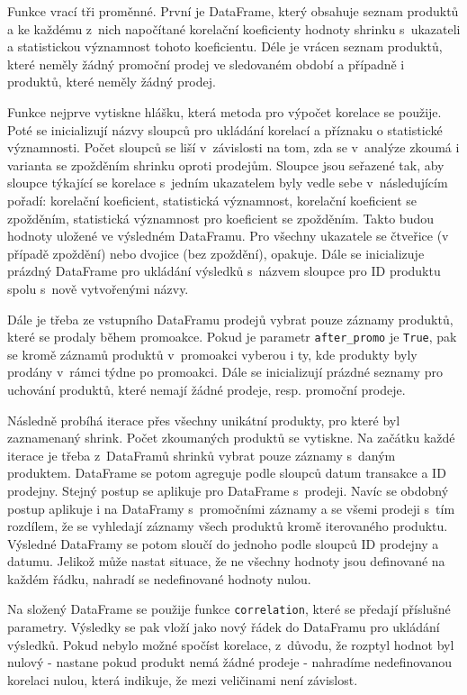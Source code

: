 Funkce vrací tři proměnné. První je DataFrame, který obsahuje seznam produktů a ke každému z~nich napočítané korelační koeficienty hodnoty shrinku s~ukazateli a statistickou významnost tohoto koeficientu. Déle je vrácen seznam produktů, které neměly žádný promoční prodej ve sledovaném období a případně i produktů, které neměly žádný prodej.

Funkce nejprve vytiskne hlášku, která metoda pro výpočet korelace se použije. Poté se inicializují názvy sloupců pro ukládání korelací a příznaku o statistické významnosti. Počet sloupců se liší v~závislosti na tom, zda se v~analýze zkoumá i varianta se zpožděním shrinku oproti prodejům. Sloupce jsou seřazené tak, aby sloupce týkající se korelace s~jedním ukazatelem byly vedle sebe v~následujícím pořadí: korelační koeficient, statistická významnost, korelační koeficient se zpožděním, statistická významnost pro koeficient se zpožděním. Takto budou hodnoty uložené ve výsledném DataFramu. Pro všechny ukazatele se čtveřice (v případě zpoždění) nebo dvojice (bez zpoždění), opakuje. Dále se inicializuje prázdný DataFrame pro ukládání výsledků s~názvem sloupce pro ID produktu spolu s~nově vytvořenými názvy. 

Dále je třeba ze vstupního DataFramu prodejů vybrat pouze záznamy produktů, které se prodaly během promoakce. Pokud je parametr \texttt{after\_promo} je \texttt{True}, pak se kromě záznamů produktů v~promoakci vyberou i ty, kde produkty byly prodány v~rámci týdne po promoakci. Dále se inicializují prázdné seznamy pro uchování produktů, které nemají žádné prodeje, resp. promoční prodeje.

Následně probíhá iterace přes všechny unikátní produkty, pro které byl zaznamenaný shrink. Počet zkoumaných produktů se vytiskne. Na začátku každé iterace je třeba z~DataFramů shrinků vybrat pouze záznamy s~daným produktem. DataFrame se potom agreguje podle sloupců datum transakce a ID prodejny. Stejný postup se aplikuje pro DataFrame s~prodeji. Navíc se obdobný postup aplikuje i na DataFramy s~promočními záznamy a se všemi prodeji s~tím rozdílem, že se vyhledají záznamy všech produktů kromě iterovaného produktu. Výsledné DataFramy se potom sloučí do jednoho podle sloupců ID prodejny a datumu. Jelikož může nastat situace, že ne všechny hodnoty jsou definované na každém řádku, nahradí se nedefinované hodnoty nulou.

Na složený DataFrame se použije funkce \texttt{correlation}, které se předají příslušné parametry. Výsledky se pak vloží jako nový řádek do DataFramu pro ukládání výsledků. Pokud nebylo možné spočíst korelace, z~důvodu, že rozptyl hodnot byl nulový - nastane pokud produkt nemá žádné prodeje -  nahradíme nedefinovanou korelaci nulou, která indikuje, že mezi veličinami není závislost.

